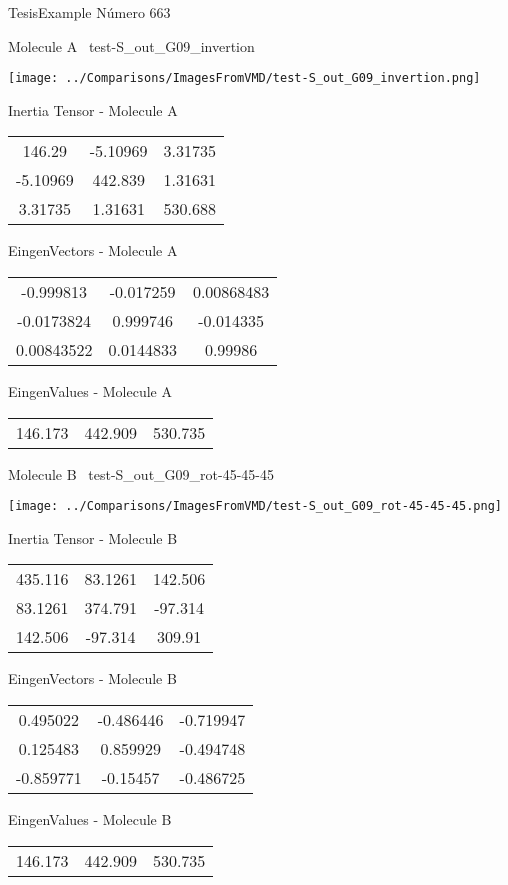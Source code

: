 \vtab[-3cm]
\begin{center}
{\large TesisExample \tab Número 663}
\end{center}
\begin{multicols}{2}
\begin{center}

Molecule A \
test-S\_out\_G09\_invertion

\texttt{[image: ../Comparisons/ImagesFromVMD/test-S\_out\_G09\_invertion.png]}

Inertia Tensor - Molecule A \\
\begin{tabular}{|c c c|}
146.29	 & 	-5.10969	 & 	3.31735	 \\
-5.10969	 & 	442.839	 & 	1.31631	 \\
3.31735	 & 	1.31631	 & 	530.688
\end{tabular}

\vtab
 EingenVectors - Molecule A     \\
\begin{tabular}{|c c c|}
-0.999813	 & 	-0.017259	 & 	0.00868483	 \\
-0.0173824	 & 	0.999746	 & 	-0.014335	 \\
0.00843522	 & 	0.0144833	 & 	0.99986
\end{tabular}

\vtab
 EingenValues - Molecule A     \\
\begin{tabular}{|c c c|}
146.173	 & 	442.909	 & 	530.735	 \\
\end{tabular}
\columnbreak

Molecule B \
test-S\_out\_G09\_rot-45-45-45

\texttt{[image: ../Comparisons/ImagesFromVMD/test-S\_out\_G09\_rot-45-45-45.png]}

Inertia Tensor - Molecule B \\
\begin{tabular}{|c c c|}
435.116	 & 	83.1261	 & 	142.506	 \\
83.1261	 & 	374.791	 & 	-97.314	 \\
142.506	 & 	-97.314	 & 	309.91
\end{tabular}

\vtab
 EingenVectors - Molecule B     \\
\begin{tabular}{|c c c|}
0.495022	 & 	-0.486446	 & 	-0.719947	 \\
0.125483	 & 	0.859929	 & 	-0.494748	 \\
-0.859771	 & 	-0.15457	 & 	-0.486725
\end{tabular}

\vtab
 EingenValues - Molecule B     \\
\begin{tabular}{|c c c|}
146.173	 & 	442.909	 & 	530.735	 \\
\end{tabular}

\end{center}
\end{multicols}

